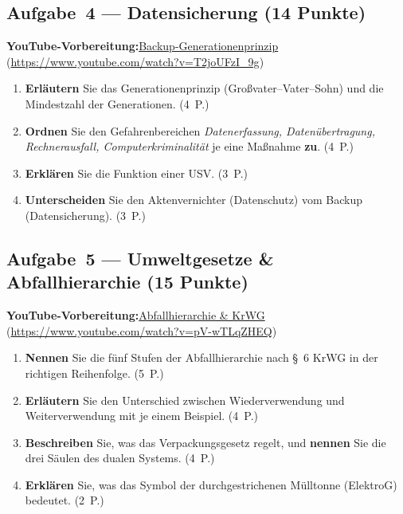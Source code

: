\documentclass[11pt, a4paper]{article}
\begin{document}
\subsection*{Aufgabe~4 --- Datensicherung (14 Punkte)}

\noindent\textbf{\color{bfwAccent}YouTube-Vorbereitung:}\enspace \href{https://www.youtube.com/watch?v=T2joUFzI_9g}{Backup-Generationenprinzip} (\url{https://www.youtube.com/watch?v=T2joUFzI_9g})

\medskip
\begin{enumerate}[label=(\alph*)]
  \item \textbf{Erläutern} Sie das Generationenprinzip (Großvater--Vater--Sohn) und die Mindestzahl der Generationen. \hfill (4~P.)
  \item \textbf{Ordnen} Sie den Gefahrenbereichen \emph{Datenerfassung, Datenübertragung, Rechnerausfall, Computerkriminalität} je eine Maßnahme \textbf{zu}. \hfill (4~P.)
  \item \textbf{Erklären} Sie die Funktion einer USV. \hfill (3~P.)
  \item \textbf{Unterscheiden} Sie den Aktenvernichter (Datenschutz) vom Backup (Datensicherung). \hfill (3~P.)
\end{enumerate}

\subsection*{Aufgabe~5 --- Umweltgesetze \& Abfallhierarchie (15 Punkte)}

\noindent\textbf{\color{bfwAccent}YouTube-Vorbereitung:}\enspace \href{https://www.youtube.com/watch?v=pV-wTLqZHEQ}{Abfallhierarchie \& KrWG} (\url{https://www.youtube.com/watch?v=pV-wTLqZHEQ})

\medskip
\begin{enumerate}[label=(\alph*)]
  \item \textbf{Nennen} Sie die fünf Stufen der Abfallhierarchie nach \S~6 KrWG in der richtigen Reihenfolge. \hfill (5~P.)
  \item \textbf{Erläutern} Sie den Unterschied zwischen Wiederverwendung und Weiterverwendung mit je einem Beispiel. \hfill (4~P.)
  \item \textbf{Beschreiben} Sie, was das Verpackungsgesetz regelt, und \textbf{nennen} Sie die drei Säulen des dualen Systems. \hfill (4~P.)
  \item \textbf{Erklären} Sie, was das Symbol der durchgestrichenen Mülltonne (ElektroG) bedeutet. \hfill (2~P.)
\end{enumerate}
\end{document}
